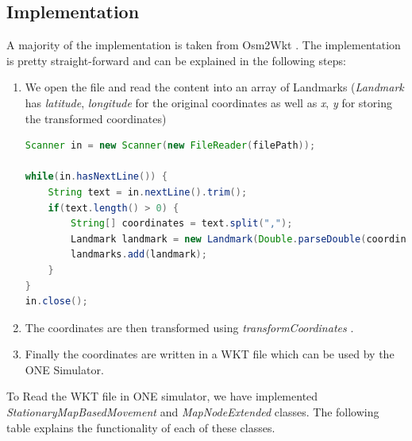\subsection{Implementation}
A majority of the implementation is taken from Osm2Wkt \cite{mayer2010osm}. The implementation is pretty straight-forward and can be explained in the following steps:
\begin{enumerate}
\item We open the file and read the content into an array of Landmarks (\textit{Landmark} has \textit{latitude}, \textit{longitude} for the original coordinates as well as \textit{x}, \textit{y} for storing the transformed coordinates)
\begin{lstlisting}[language=java]
Scanner in = new Scanner(new FileReader(filePath));

while(in.hasNextLine()) {
	String text = in.nextLine().trim();
	if(text.length() > 0) {
		String[] coordinates = text.split(",");
		Landmark landmark = new Landmark(Double.parseDouble(coordinates[0]), Double.parseDouble(coordinates[1]));
		landmarks.add(landmark);
	}
}
in.close();
\end{lstlisting}
\item The coordinates are then transformed using \textit{transformCoordinates} \cite{mayer2010osm}.
\item Finally the coordinates are written in a WKT file which can be used by the ONE Simulator.
\end{enumerate}

To Read the WKT file in ONE simulator, we have implemented \textit{StationaryMapBasedMovement} and \textit{MapNodeExtended} classes. The following table explains the functionality of each of these classes.

